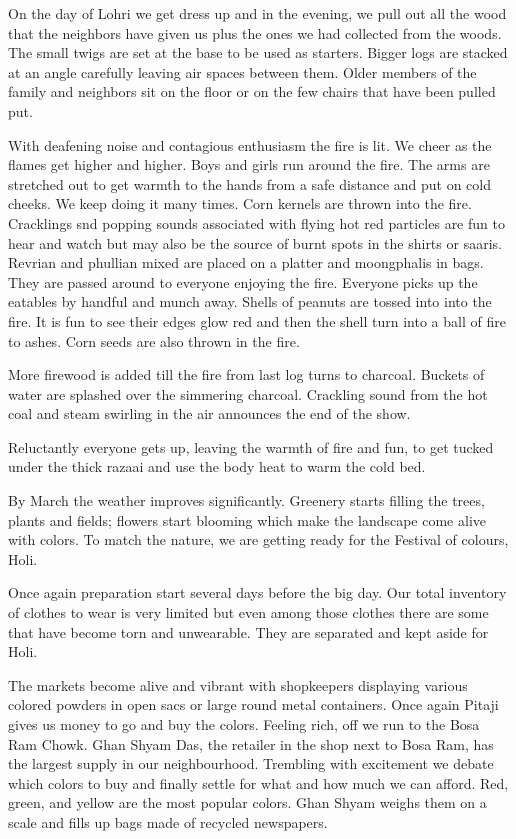 On the day of Lohri we get dress up and in the evening, we pull out all
the wood that the neighbors have given us plus the ones we had collected
from the woods. The small twigs are set at the base to be used as
starters. Bigger logs are stacked at an angle carefully leaving air spaces
between them. Older members of the family and neighbors sit on the floor
or on the few chairs that have been pulled put. 

With deafening noise and contagious enthusiasm the fire is lit. We cheer
as the flames get higher and higher. Boys and girls run around the fire.
The arms are stretched out to get warmth to the hands from a safe distance
and put on cold cheeks. We keep doing it many times. Corn kernels are
thrown into the fire. Cracklings snd popping sounds  associated with
flying hot red particles are fun to hear and watch but may also be the
source of burnt spots in the shirts or saaris. Revrian and phullian mixed
are placed on a platter and moongphalis in bags. They are passed around to
everyone enjoying the fire.   Everyone picks up the eatables by handful
and munch away. Shells of peanuts are tossed into into the fire. It is fun
to see their edges glow red and then the shell turn into a ball of fire to
ashes. Corn seeds are also thrown in the fire. 

More firewood is added till the fire from last log turns to charcoal.
Buckets of water are splashed over the simmering charcoal. Crackling sound
from the hot coal and steam swirling in the air announces the end of the
show. 

Reluctantly everyone gets up, leaving the warmth of fire and fun, to get
tucked under the thick razaai and use the body heat to warm the cold bed. 

By March the weather improves significantly. Greenery starts filling the
trees, plants and fields; flowers start blooming which make the landscape
come alive with colors. To match the nature, we are getting ready for the
Festival of colours, Holi. 

Once again preparation start several days before the big day. Our total
inventory of clothes to wear is very limited but even among those clothes
there are some that have become torn and unwearable. They are separated
and kept aside for Holi. 

The markets become alive and vibrant with shopkeepers displaying various
colored powders in open sacs or large round metal containers. Once again
Pitaji gives us money to go and buy the colors. Feeling rich, off we run
to the Bosa Ram Chowk. Ghan Shyam Das, the retailer in the shop next to
Bosa Ram, has the largest supply in our neighbourhood. Trembling with
excitement we debate which colors to buy and finally settle for what and
how much we can afford. Red, green, and  yellow are the most popular
colors. Ghan Shyam weighs them on a scale and fills up bags made of
recycled newspapers. 

